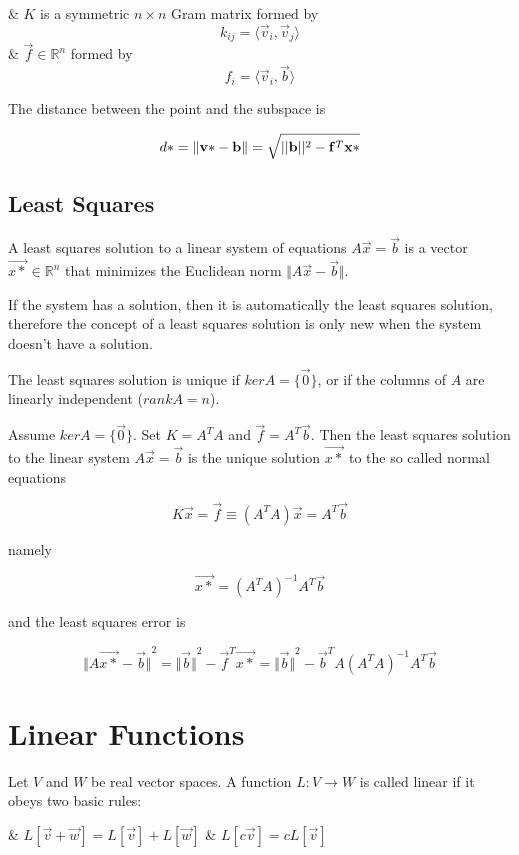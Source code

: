 \begin{easylist}[enumerate]
    & $K$ is a symmetric $n \times n$ Gram matrix formed by
        \[ k_{ij} = \langle \vec{v}_i, \vec{v}_j \rangle \]
    & $\vec{f} \in \mathbb{R}^n$ formed by
        \[ f_i = \langle \vec{v}_i, \vec{b} \rangle \]
\end{easylist}

The distance between the point and the subspace is

\[ d* = \Vert \mathbf{v*} - \mathbf{b} \Vert = \sqrt{\lvert \lvert \mathbf{b} \rvert \rvert^2 - \mathbf{f}^T \mathbf{x*} } \]

    \subsection{Least Squares}
    A least squares solution to a linear system of equations $A \vec{x} = \vec{b}$ is a vector $\vec{x*} \in \mathbb{R}^n$ that minimizes the Euclidean norm $\Vert A \vec{x} - \vec{b} \Vert$.

    If the system has a solution, then it is automatically the least squares solution, therefore the concept of a least squares solution is only new when the system doesn't have a solution.

    The least squares solution is unique if $ker A = \{\vec{0}\}$, or if the columns of $A$ are linearly independent ($rank A = n$).

    Assume $ker A = \{ \vec{0} \}$. Set $K = A^T A$ and $\vec{f} = A^T \vec{b}$. Then the least squares solution to the linear system $A \vec{x} = \vec{b}$ is the unique solution $\vec{x*}$ to the so called normal equations

    \[ K \vec{x} = \vec{f} \equiv (A^T A) \vec{x} = A^T \vec{b} \]

    namely

    \[ \vec{x*} = (A^T A)^{-1} A^T \vec{b} \]

    and the least squares error is

    \[ {\Vert A \vec{x*} - \vec{b} \Vert}^2 = {\Vert \vec{b} \Vert}^2 - \vec{f}^T \vec{x*} = {\Vert \vec{b} \Vert}^2 - \vec{b}^T A (A^T A)^{-1} A^T \vec{b} \]

\section{Linear Functions}
Let $V$ and $W$ be real vector spaces. A function $L: V \to W$ is called linear if it obeys two basic rules:

\begin{easylist}[enumerate]
    & $L[\vec{v} + \vec{w}] = L[\vec{v}] + L[\vec{w}]$
    & $L[c \vec{v}] = c L[\vec{v}]$
\end{easylist}

